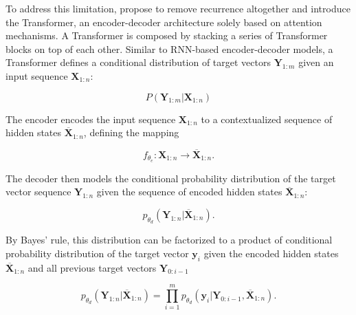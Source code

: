 
To address this limitation, \citet{vaswani2017attention} propose to remove recurrence altogether and introduce the Transformer, an encoder-decoder architecture solely based on attention mechanisms. A Transformer is composed by stacking a series of Transformer blocks on top of each other. Similar to \ac{RNN}-based encoder-decoder models, a Transformer defines a conditional distribution of target vectors $\bm{Y}_{1:m}$ given an input sequence $\bm{X}_{1:n}$:

\begin{equation}
    P(\bm{Y}_{1:m} | \bm{X}_{1:n})
\end{equation}

The encoder encodes the input sequence $\bm{X}_{1:n}$ to a contextualized sequence of hidden states $\bm{\overline{X}}_{1:n}$, defining the mapping

\begin{equation}
    f_{\theta_e}: \bm{X}_{1:n} \rightarrow \bm{\overline{X}}_{1:n}.
\end{equation}

The decoder then models the conditional probability distribution of the target vector sequence $\bm{Y}_{1:n}$ given the sequence of encoded hidden states $\bm{\overline{X}}_{1:n}$:

\begin{equation}
    p_{\theta_d}(\bm{{Y}}_{1:n} | \bm{\overline{X}}_{1:n}).
\end{equation}

By Bayes' rule, this distribution can be factorized to a product of conditional probability distribution of the target vector $\bm{y}_i$ given the encoded hidden states $\bm{\overline{X}}_{1:n}$ and all previous target vectors $\bm{Y}_{0:i-1}$

\begin{equation}
    p_{\theta_d}(\bm{Y}_{1:n} | \bm{\overline{X}}_{1:n}) = \prod_{i=1}^{m} p_{\theta_d}(\bm{y}_i | \bm{Y}_{0: i-1}, \bm{\overline{X}}_{1:n}).
\label{equation:transformer-conditional-prob-target-seq}
\end{equation}

